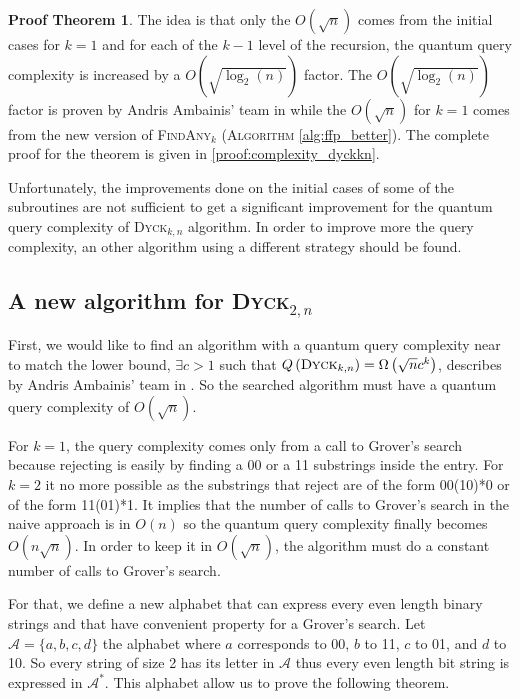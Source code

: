 \documentclass[11pt,a4paper]{article}
\newcommand{\Dyck}[1]{\textsc{Dyck$_{#1}$}}
\newcommand{\FA}[1]{\textsc{FindAny$_{#1}$}}
\theoremstyle{definition}
\theoremstyle{plain}
\theoremstyle{definition}
\newtheorem{tproof}{Proof Theorem}[section]
\begin{document}
\begin{tproof}
    The idea is that only the $O\left(\sqrt{n}\right)$ comes from the initial cases for $k = 1$ and
    for each of the $k-1$ level of the recursion, the quantum query complexity is increased by
    a $O\left(\sqrt{\log_2(n)}\right)$ factor. The $O\left(\sqrt{\log_2(n)}\right)$ factor
    is proven by Andris Ambainis' team in \cite{art:2DGrid} while the $O\left(\sqrt{n}\right)$
    for $k = 1$ comes from the new version of \FA{k} (\textsc{Algorithm} \autoref{alg:ffp_better}).
    The complete proof for the theorem is given in \autoref{proof:complexity_dyckkn}.
\end{tproof}

Unfortunately, the improvements done on the initial cases of some of the subroutines are not sufficient
to get a significant improvement for the quantum query complexity of \Dyck{k,n} algorithm. In order to
improve more the query complexity, an other algorithm using a different strategy should be found.

\subsection{A new algorithm for \Dyck{2,n}}

First, we would like to find an algorithm with a quantum query complexity near to match the lower bound,
$\exists c > 1$ such that $Q\left(\Dyck{k,n}\right)=\Omega\left(\sqrt{n}c^k\right)$, describes by Andris
Ambainis' team in \cite{art:2DGrid}. So the searched algorithm must have a quantum query
complexity of $O\left(\sqrt{n}\right)$.

For $k=1$, the query complexity comes only from a call to Grover's search
because rejecting is easily by finding a 00 or a 11 substrings inside the entry. For $k=2$
it no more possible as the substrings that reject are of the form 00(10)*0 or of the form 11(01)*1. It
implies that the number of calls to Grover's search in the naive approach is in $O\left(n\right)$ so the
quantum query complexity finally becomes $O\left(n\sqrt{n}\right)$. In order to keep it in
$O\left(\sqrt{n}\right)$, the algorithm must do a constant number of calls to Grover's search.

For that, we define a new alphabet that can express every even length binary
strings and that have convenient property for a Grover's search. Let
$\mathcal{A} = \{a, b, c, d\}$ the alphabet where $a$ corresponds to 00, $b$ to 11, $c$
to 01, and $d$ to 10. So every string of size 2 has its letter in $\mathcal{A}$ thus every
even length bit string is expressed in $\mathcal{A}^*$. This alphabet allow us to prove the
following theorem.
\end{document}
